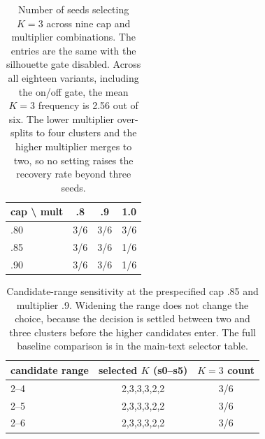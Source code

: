\begin{table}[H]
\centering
\footnotesize
\caption{Number of seeds selecting $K=3$ across nine cap and multiplier combinations. The entries are the same with the silhouette gate disabled. Across all eighteen variants, including the on/off gate, the mean $K=3$ frequency is 2.56 out of six. The lower multiplier over-splits to four clusters and the higher multiplier merges to two, so no setting raises the recovery rate beyond three seeds.}
\label{tab:gatesens}
\begin{tabular}{lccc}
\hline
cap \textbackslash{} mult & .8 & .9 & 1.0\\
\hline
.80 & 3/6 & 3/6 & 3/6\\
.85 & 3/6 & 3/6 & 1/6\\
.90 & 3/6 & 3/6 & 1/6\\
\hline
\end{tabular}

\end{table}

\begin{table}[H]
\centering
\footnotesize
\caption{Candidate-range sensitivity at the prespecified cap .85 and multiplier .9. Widening the range does not change the choice, because the decision is settled between two and three clusters before the higher candidates enter. The full baseline comparison is in the main-text selector table.}
\label{tab:rangesens}
\begin{tabular}{lcc}
\hline
candidate range & selected $K$ (s0–s5) & $K=3$ count\\
\hline
2–4 & 2,3,3,3,2,2 & 3/6\\
2–5 & 2,3,3,3,2,2 & 3/6\\
2–6 & 2,3,3,3,2,2 & 3/6\\
\hline
\end{tabular}

\end{table}
